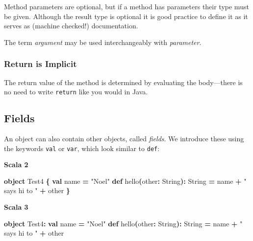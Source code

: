 \documentclass[11pt,a5paper,]{book}
\newenvironment{Shaded}{\begin{snugshade}}{\end{snugshade}}
\newcommand{\ExtensionTok}[1]{#1}
\newcommand{\FunctionTok}[1]{\textcolor[rgb]{0.00,0.00,0.00}{#1}}
\newcommand{\KeywordTok}[1]{\textcolor[rgb]{0.13,0.29,0.53}{\textbf{#1}}}
\newcommand{\NormalTok}[1]{#1}
\newcommand{\OperatorTok}[1]{\textcolor[rgb]{0.81,0.36,0.00}{\textbf{#1}}}
\newcommand{\StringTok}[1]{\textcolor[rgb]{0.31,0.60,0.02}{#1}}
\begin{document}
Method parameters are optional, but if a method has parameters their
type must be given. Although the result type is optional it is good
practice to define it as it serves as (machine checked!) documentation.

The term \emph{argument} may be used interchangeably with
\emph{parameter}.

\hypertarget{return-is-implicit}{%
\subsubsection*{Return is Implicit}\label{return-is-implicit}}

The return value of the method is determined by evaluating the
body---there is no need to write \texttt{return} like you would in Java.

\hypertarget{fields}{%
\subsection{Fields}\label{fields}}

An object can also contain other objects, called \emph{fields}. We
introduce these using the keywords \texttt{val} or \texttt{var}, which
look similar to \texttt{def}:

\textbf{Scala 2}

\begin{Shaded}
\begin{Highlighting}[]
\KeywordTok{object}\NormalTok{ Test4 }\OperatorTok{\{}
  \KeywordTok{val}\NormalTok{ name }\OperatorTok{=} \StringTok{"Noel"}
  \KeywordTok{def} \FunctionTok{hello}\OperatorTok{(}\NormalTok{other}\OperatorTok{:} \ExtensionTok{String}\OperatorTok{):} \ExtensionTok{String} \OperatorTok{=}
\NormalTok{    name }\OperatorTok{+} \StringTok{" says hi to "} \OperatorTok{+}\NormalTok{ other}
\OperatorTok{\}}
\end{Highlighting}
\end{Shaded}

\textbf{Scala 3}

\begin{Shaded}
\begin{Highlighting}[]
\KeywordTok{object}\NormalTok{ Test4}\OperatorTok{:}
  \KeywordTok{val}\NormalTok{ name }\OperatorTok{=} \StringTok{"Noel"}
  \KeywordTok{def} \FunctionTok{hello}\OperatorTok{(}\NormalTok{other}\OperatorTok{:} \ExtensionTok{String}\OperatorTok{):} \ExtensionTok{String} \OperatorTok{=}
\NormalTok{    name }\OperatorTok{+} \StringTok{" says hi to "} \OperatorTok{+}\NormalTok{ other}
\end{Highlighting}
\end{Shaded}
\end{document}
